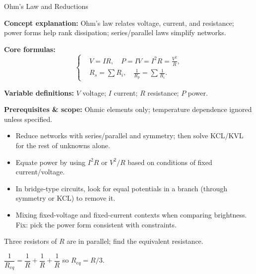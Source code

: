 \label{unit:circuits}

\begin{KnowledgePoint}{Ohm's Law and Reductions \Core}
  \KPFormulas
  \begin{formulabox}
  \textbf{Concept explanation:} Ohm's law relates voltage, current, and resistance; power forms help rank dissipation; series/parallel laws simplify networks.

  \textbf{Core formulas:}
  \[
  \left\{\begin{aligned}
    &V=IR,\quad P=IV=I^2R=\frac{V^2}{R},\\
    &R_s=\sum R_i,\quad \frac{1}{R_p}=\sum \frac{1}{R_i}.
  \end{aligned}\right.
  \]

  \textbf{Variable definitions:} $V$ voltage; $I$ current; $R$ resistance; $P$ power.

  \textbf{Prerequisites \& scope:} Ohmic elements only; temperature dependence ignored unless specified.
  \end{formulabox}

  \KPHeuristics
  \begin{heuristicsbox}
\begin{itemize}[leftmargin=*]
  \item Reduce networks with series/parallel and symmetry; then solve KCL/KVL for the rest of unknowns alone.
  \item Equate power by using $I^2 R$ or $V^2/R$ based on conditions of fixed current/voltage.
  \item In bridge-type circuits, look for equal potentials in a branch (through symmetry or KCL) to remove it.
\end{itemize}
  \vspace{0.4em}
  \begin{itemize}[leftmargin=*]
    \item Mixing fixed-voltage and fixed-current contexts when comparing brightness. Fix: pick the power form consistent with constraints.
  \end{itemize}
  \end{heuristicsbox}

  \KPProblems
\begin{cheatproblem}
  Three resistors of $R$ are in parallel; find the equivalent resistance.
  \begin{solutionbox}
  $\dfrac{1}{R_{eq}}=\dfrac{1}{R}+\dfrac{1}{R}+\dfrac{1}{R}$ so $R_{eq}=R/3$.
  \end{solutionbox}
  \end{cheatproblem}
\end{KnowledgePoint}

